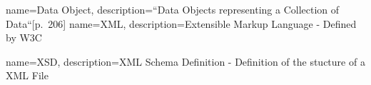 {
	name={Data Object},
	description={``Data Objects representing a Collection of Data``[p.~206]\cite{bpmnstandard} }
}
{
	name={XML},
	description={Extensible Markup Language - Defined by W3C\cite{bray1997extensibl} }
}

{
	name={XSD},
	description={XML Schema Definition - Definition of the stucture of a XML File\cite{bray1997extensibl} }
}